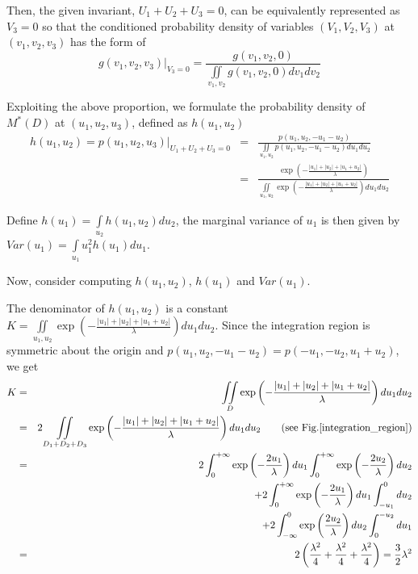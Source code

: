 \documentclass[11pt]{article}
\begin{document}
Then, the given invariant, $U_1+U_2+U_3=0$, can be equivalently represented as $V_3=0$ so that the conditioned probability density of variables $(V_1,V_2,V_3)$ at $(v_1,v_2,v_3)$ has the form of
$$
g\left(v_{1}, v_{2}, v_{3}\right)|_{V_{3}=0}=\frac{g\left(v_{1}, v_{2}, 0\right)}{\underset{v_1,v_2} \iint g\left(v_{1}, v_{2}, 0\right) d v_{1} d v_{2}}
$$

Exploiting the above proportion, we formulate the probability density of $M^{\ast}(D)$ at $(u_1,u_2,u_3)$, defined as $h\left(u_1,u_2\right)$
\begin{eqnarray*}
  h\left(u_1,u_2\right)
  =p\left(u_{1}, u_{2}, u_{3}\right)|_{U_1+U_2+U_3=0}
  & =&\frac{p\left(u_{1}, u_{2}, -u_{1}-u_{2}\right)}{\underset{u_1,u_2} \iint p\left(u_{1}, u_{2}, -u_{1}-u_{2}\right) d u_{1} d u_{2}} \\ 
  & =&\frac{\exp \left(-\frac{|u_1|+|u_2|+|u_1+u_2|}{\lambda}\right)}{
  \underset{u_1,u_2}\iint \exp \left(-\frac{|u_1|+|u_2|+|u_1+u_2|}{\lambda}\right) d u_{1} d u_{2}}
\end{eqnarray*}


Define $h(u_1)=\underset{u_2}\int h(u_1,u_2) d u_2$, the marginal variance of $u_1$ is then given by $Var(u_1)=\underset{u_1}{\int} u_1^2 h(u_1) d u_1$.

Now, consider computing $h(u_1,u_2)$, $h(u_1)$ and $Var(u_1)$.


The denominator of $h(u_1,u_2)$ is a constant $K=\underset{u_1,u_2} \iint \exp \left(-\frac{|u_1|+|u_2|+|u_1+u_2|}{\lambda}\right) d u_{1} d u_{2}$. Since the integration region is symmetric about the origin and $p\left(u_{1}, u_{2}, -u_{1}-u_{2}\right)=p\left(-u_{1}, -u_{2}, u_{1}+u_{2}\right)$, we get
\begin{eqnarray*}
   K&=&\underset{D} \iint \exp \left(-\frac{|u_1|+|u_2|+|u_1+u_2|}{\lambda}\right) d u_{1} d u_{2} \\
    &=&2\underset{D_1+D_2+D_3} \iint \exp \left(-\frac{|u_1|+|u_2|+|u_1+u_2|}{\lambda}\right) d u_{1} d u_{2} \qquad(\text{see Fig.}\ref{integration_region})\\
    &=&2\int_{0}^{+\infty} \exp\left(-\frac{2u_1}{\lambda}\right) d u_1 \int_{0}^{+\infty} \exp\left(-\frac{2u_2}{\lambda}\right) d u_2\\
    &\;&+2\int_{0}^{+\infty} \exp\left(-\frac{2u_1}{\lambda}\right) d u_1 \int_{-u_1}^{0}  d u_2\\
    &\;&+2\int_{-\infty}^{0} \exp\left(\frac{2u_2}{\lambda}\right) d u_2 \int_{0}^{-u_2}  d u_1\\
    &=&2\left(\frac{{\lambda}^2}{4}+\frac{{\lambda}^2}{4}+\frac{{\lambda}^2}{4}\right)=\frac{3}{2}{\lambda}^2 
\end{eqnarray*}
\end{document}
